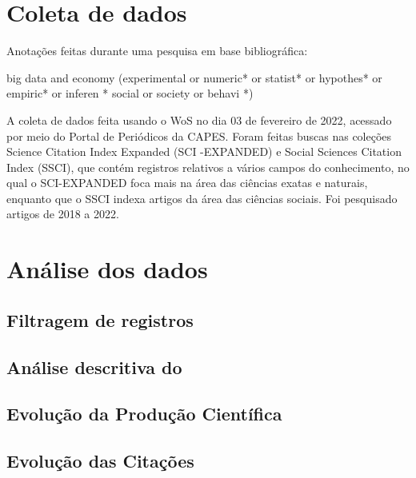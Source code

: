 \section{Coleta de dados}

Anotações feitas durante uma pesquisa em base bibliográfica:

big data and economy (experimental  or  numeric* or  statist* or  hypothes* or  empiric* or  inferen * social  or  society  or  behavi *)

A coleta de dados feita usando o WoS no dia 03 de fevereiro de 2022, acessado por meio do Portal de Periódicos da CAPES. Foram feitas buscas nas coleções Science  Citation  Index  Expanded (SCI -EXPANDED) e Social  Sciences  Citation  Index (SSCI), que contém registros relativos a vários campos do conhecimento, no qual o SCI-EXPANDED foca mais na área das ciências exatas e naturais, enquanto que o SSCI indexa artigos da área das ciências sociais.
Foi pesquisado artigos de 2018 a 2022.

\section{Análise dos dados}

\subsection{Filtragem de registros}

\subsection{Análise descritiva do }



\subsection{Evolução da Produção Científica}




\subsection{Evolução das Citações}
